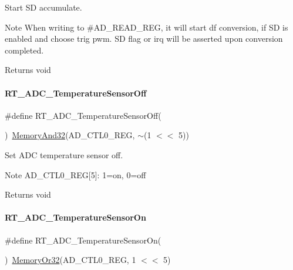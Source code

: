 Start SD accumulate. 

\begin{DoxyNote}{Note}
When writing to \#\+A\+D\+\_\+\+R\+E\+A\+D\+\_\+\+R\+EG, it will start df conversion, if SD is enabled and choose trig pwm. SD flag or irq will be asserted upon conversion completed. 
\end{DoxyNote}
\begin{DoxyReturn}{Returns}
void 
\end{DoxyReturn}
\mbox{\label{a00002_a592b3503c0efb0d01f07c151ea6aaa91}} 
\paragraph{\texorpdfstring{R\+T\+\_\+\+A\+D\+C\+\_\+\+Temperature\+Sensor\+Off}{RT\_ADC\_TemperatureSensorOff}}
{\footnotesize\ttfamily \#define R\+T\+\_\+\+A\+D\+C\+\_\+\+Temperature\+Sensor\+Off(\begin{DoxyParamCaption}{ }\end{DoxyParamCaption})~\mbox{\hyperlink{a00020_ad87cedffcaadc51db22594fce55173d4}{Memory\+And32}}(A\+D\+\_\+\+C\+T\+L0\+\_\+\+R\+EG, $\sim$(1 $<$$<$ 5))}



Set A\+DC temperature sensor off. 

\begin{DoxyNote}{Note}
A\+D\+\_\+\+C\+T\+L0\+\_\+\+R\+EG\mbox{[}5\mbox{]}\+: 1=on, 0=off 
\end{DoxyNote}
\begin{DoxyReturn}{Returns}
void 
\end{DoxyReturn}
\mbox{\label{a00002_a499716b82c53672422efd8ad4fd4c9ab}} 
\paragraph{\texorpdfstring{R\+T\+\_\+\+A\+D\+C\+\_\+\+Temperature\+Sensor\+On}{RT\_ADC\_TemperatureSensorOn}}
{\footnotesize\ttfamily \#define R\+T\+\_\+\+A\+D\+C\+\_\+\+Temperature\+Sensor\+On(\begin{DoxyParamCaption}{ }\end{DoxyParamCaption})~\mbox{\hyperlink{a00020_a27874a97deab7cecdde5ddecf466e31e}{Memory\+Or32}}(A\+D\+\_\+\+C\+T\+L0\+\_\+\+R\+EG, 1 $<$$<$ 5)}



